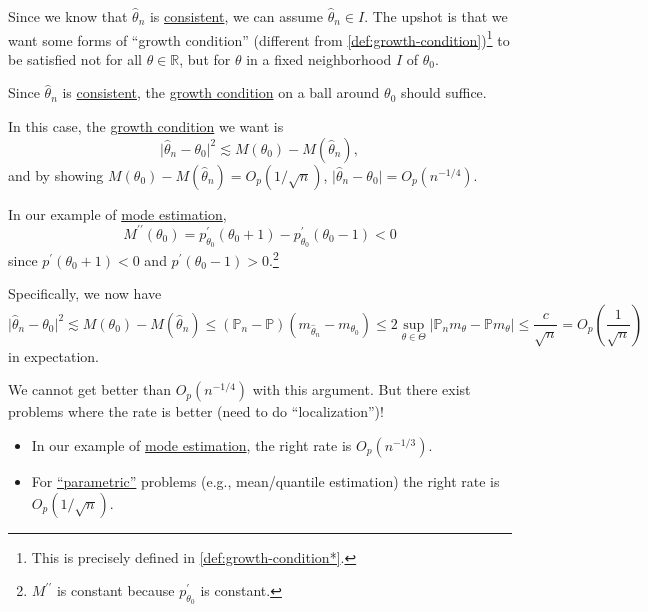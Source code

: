 Since we know that \(\hat{\theta } _n \) is \hyperref[def:consistent]{consistent}, we can assume \(\hat{\theta } _n \in I\). The upshot is that we want some forms of ``growth condition'' (different from \autoref{def:growth-condition})\footnote{This is precisely defined in \autoref{def:growth-condition*}.} to be satisfied not for all \(\theta \in \mathbb{R} \), but for \(\theta \) in a fixed neighborhood \(I\) of \(\theta _0\).

\begin{intuition}
	Since \(\hat{\theta } _n \) is \hyperref[def:consistent]{consistent}, the \hyperref[def:growth-condition*]{growth condition} on a ball around \(\theta _0\) should suffice.
\end{intuition}

In this case, the \hyperref[def:growth-condition*]{growth condition} we want is
\[
	\vert \hat{\theta } _n - \theta _0 \vert ^2 \lesssim M(\theta _0) - M(\hat{\theta} _n ) ,
\]
and by showing \(M(\theta _0) - M(\hat{\theta} _n) = O_p(1 / \sqrt{n} )\), \(\vert \hat{\theta } _n - \theta _0 \vert = O_p(n^{-1 / 4})\).

\begin{note}
	In our example of \hyperref[eg:mode-estimation]{mode estimation},
	\[
		M^{\prime\prime} (\theta _0)
		= p_{\theta _0}^{\prime} (\theta _0 + 1) - p_{\theta _0}^{\prime} (\theta _0 - 1)
		< 0
	\]
	since \(p^{\prime} (\theta _0+1) < 0\) and \(p^{\prime} (\theta _0 - 1) > 0\).\footnote{\(M^{\prime\prime} \) is constant because \(p_{\theta _0}^{\prime} \) is constant.}
\end{note}

Specifically, we now have
\[
	\vert \hat{\theta } _n - \theta _0 \vert ^2
	\lesssim M(\theta _0) - M(\hat{\theta } _n )
	\leq (\mathbb{P} _n - \mathbb{P} ) (m_{\hat{\theta } _n } - m_{\theta _0})
	\leq 2 \sup _{\theta \in \Theta } \vert \mathbb{P} _n m_\theta - \mathbb{P} m_\theta \vert
	\leq \frac{c}{\sqrt{n} }
	= O_p \left( \frac{1}{\sqrt{n} } \right)
\]
in expectation.

\begin{remark}
	We cannot get better than \(O_p(n^{-1 / 4})\) with this argument. But there exist problems where the rate is better (need to do ``localization'')!
	\begin{itemize}
		\item In our example of \hyperref[eg:mode-estimation]{mode estimation}, the right rate is \(O_p(n^{-1 / 3})\).
		\item For \hyperref[def:parametric]{``parametric''} problems (e.g., mean/quantile estimation) the right rate is \(O_p(1 / \sqrt{n} )\).
	\end{itemize}
\end{remark}

